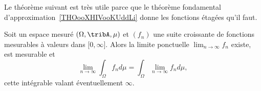 Le théorème suivant est très utile parce que le théorème fondamental d'approximation~\ref{THOooXHIVooKUddLi} donne les fonctions étagées qu'il faut.

\begin{theorem} \label{ThoRRDooFUvEAN}
	Soit un espace mesuré \( (\Omega,\tribA,\mu)\) et \( (f_n)\) une suite croissante de fonctions mesurables à valeurs dans \( \mathopen[ 0 , \infty \mathclose]\). Alors la limite ponctuelle \( \lim_{n\to \infty} f_n\) existe, est mesurable et
	\begin{equation}    \label{EqFHqCmLV}
		\lim_{n\to \infty} \int_{\Omega}f_nd\mu= \int_{\Omega}\lim_{n\to \infty} f_nd\mu,
	\end{equation}
	cette intégrable valant éventuellement \( \infty\).
\end{theorem}

